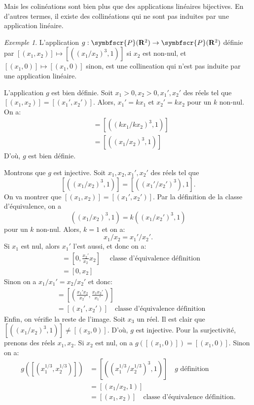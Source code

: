 \documentclass[10pt]{memoir}
\theoremstyle{definition}
\theoremstyle{remark}
\newtheorem{exm}{Exemple}
\newcommand{\proj}{\symbfscr{P}}
\newcommand{\R}{\mathbf{R}}
\begin{document}
Mais les colinéations sont bien plus que des applications linéaires bijectives.
En d'autres termes, il existe des collinéations qui ne sont pas induites par une
application linéaire.
\begin{exm}
  L'application $g: \proj(\R^2) \to \proj(\R^2)$ définie par
  $[(x_1, x_2)] \mapsto [((x_{1} / x_{2})^3, 1)]$ si $x_{2}$ est non-nul, et
  $[(x_{1}, 0)] \mapsto [(x_{1}, 0)]$ sinon, est une collineation qui n'est pas
  induite par une application linéaire.

  L'application $g$ est bien définie. Soit $x_{1} > 0, x_{2} > 0, x_{1}', x_{2}'$ des
  réels tel que
  $[(x_{1}, x_{2})] = [(x_{1}', x_{2}')]$. Alors, $x_{1}' = kx_{1}$ et
  $x_{2}' = kx_{2}$ pour un $k$ non-nul. On a:
  \begin{align*}
    [((x_{1}' / x_{2}')^{3}, 1)] &= [((kx_{1} / kx_{2})^{3}, 1)] \\
                                 &= [((x_{1} / x_{2})^{3}, 1)]
  \end{align*}
  D'où, $g$ est bien définie.

  Montrons que $g$ est injective. Soit $x_{1}, x_{2}, x_{1}', x_{2}'$ des réels
  tel que
  $$
  [((x_{1} / x_{2})^{3}, 1)] = [((x_{1}' / x_{2}')^{3}), 1].
  $$
  On va montrer que $[(x_{1}, x_{2})] = [(x_{1}', x_{2}')]$. Par la définition
  de la classe d'équivalence, on a
  $$
  ((x_{1} / x_{2})^{3}, 1) = k ((x_{1} / x_{2}')^{3}, 1)
  $$
  pour un $k$ non-nul. Alors, $k = 1$ et on a:
  $$
  x_{1} / x_{2} = x_{1}' / x_{2}'.
  $$
  Si $x_{1}$ est nul, alors $x_{1}'$ l'est aussi, et donc on a:
  \begin{align*}
    [(0, x_{2})] &= [0, \frac{x_{2}'}{x_{2}} x_{2}] \quad \text{ classe
                   d'équivalence définition} \\
                 &= [0, x_{2}]
  \end{align*}
  Sinon on a $x_{1} / x_{1}' = x_{2} / x_{2}'$ et donc:
  \begin{align*}
    [(x_{1}, x_{2})] &= [(\frac{x_{1}' x_{2}}{x_{2}'}, \frac{x_{1} x_{2}'}{x_{1}'})] \\
                     &= [(x_{1}', x_{2}')] \quad \text{classe d'équivalence définition}
  \end{align*}
  Enfin, on vérifie la reste de l'image. Soit $x_{3}$ un réel. Il est clair que
  $[((x_{1} / x_{2})^{3}, 1)] \neq [(x_{3}, 0)]$. D'où, $g$ est injective. Pour
  la surjectivité, prenons des réels $x_{1}, x_{2}$. Si $x_{2}$ est nul, on a
  $g([(x_{1}, 0)]) = [(x_{1}, 0)]$. Sinon on a:
  \begin{align*}
    g([(x_{1}^{1/3}, x_{2}^{1/3})]) &= [((x_{1}^{1/3} / x_{2}^{1/3})^{3}, 1)]
                                      \quad \text{$g$ définition} \\
                                    &= [(x_{1} / x_{2}, 1)] \\
                                    &= [(x_{1}, x_{2})]
                                      \quad \text{classe d'équivalence définition}.
  \end{align*}


\end{exm}
\end{document}
